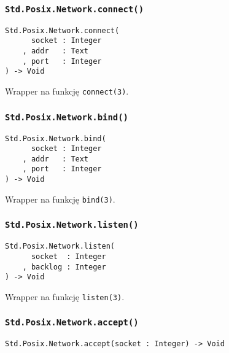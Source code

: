 \subsubsection{\texttt{Std.Posix.Network.connect()}}

\begin{small}
\begin{lstlisting}
Std.Posix.Network.connect(
      socket : Integer
    , addr   : Text
    , port   : Integer
) -> Void
\end{lstlisting}
\end{small}

Wrapper na funkcję \texttt{connect(3)}.

\subsubsection{\texttt{Std.Posix.Network.bind()}}

\begin{small}
\begin{lstlisting}
Std.Posix.Network.bind(
      socket : Integer
    , addr   : Text
    , port   : Integer
) -> Void
\end{lstlisting}
\end{small}

Wrapper na funkcję \texttt{bind(3)}.

\subsubsection{\texttt{Std.Posix.Network.listen()}}

\begin{small}
\begin{lstlisting}
Std.Posix.Network.listen(
      socket  : Integer
    , backlog : Integer
) -> Void
\end{lstlisting}
\end{small}

Wrapper na funkcję \texttt{listen(3)}.

\subsubsection{\texttt{Std.Posix.Network.accept()}}

\begin{small}
\begin{lstlisting}
Std.Posix.Network.accept(socket : Integer) -> Void
\end{lstlisting}
\end{small}

